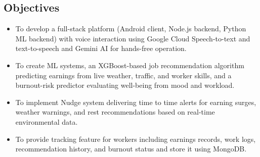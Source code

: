 \documentclass[12pt,a4paper]{article}
\begin{document}
\subsection{Objectives}
\begin{itemize}
    \item To develop a full-stack platform (Android client, Node.js backend, Python  ML backend) with voice interaction using Google Cloud Speech-to-text and text-to-speech and Gemini AI for hands-free operation.
    \item To create ML systems, an XGBoost-based job recommendation algorithm predicting earnings from live weather, traffic, and worker skills, and a burnout-risk predictor evaluating well-being from mood and workload.
    \item To implement  Nudge system delivering time to time alerts for earning surges, weather warnings, and rest recommendations based on real-time environmental data.
    \item To provide tracking feature for workers including earnings records, work logs, recommendation history, and burnout status and store it using MongoDB.
\end{itemize}
\end{document}
